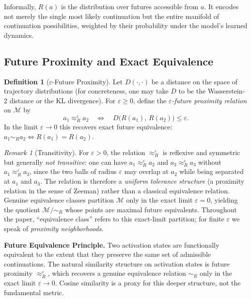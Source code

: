 \documentclass[12pt, a4paper]{article}
\theoremstyle{plain}
\theoremstyle{definition}
\newtheorem{definition}[theorem]{Definition}
\theoremstyle{remark}
\newtheorem{remark}[theorem]{Remark}
\newcommand{\cM}{\mathcal{M}}
\newcommand{\simR}{\sim_R}
\newcommand{\reachset}[1]{R(#1)}
\begin{document}
Informally, $\reachset{a}$ is the distribution over futures accessible from
$a$. It encodes not merely the single most likely continuation but the entire
manifold of continuation possibilities, weighted by their probability under
the model's learned dynamics.

\subsection{Future Proximity and Exact Equivalence}

\begin{definition}[$\varepsilon$-Future Proximity]
  Let $D(\cdot, \cdot)$ be a distance on the space of trajectory distributions
  (for concreteness, one may take $D$ to be the Wasserstein-2 distance or the
  KL divergence). For $\varepsilon \geq 0$, define the
  \emph{$\varepsilon$-future proximity relation} on $\cM$ by
  \begin{equation}
    a_1 \approx_R^\varepsilon a_2
    \quad\iff\quad
    D\bigl(\reachset{a_1},\, \reachset{a_2}\bigr) \leq \varepsilon.
  \end{equation}
  In the limit $\varepsilon \to 0$ this recovers exact future equivalence:
  $a_1 \simR a_2 \iff \reachset{a_1} = \reachset{a_2}$.
\end{definition}

\begin{remark}[Transitivity]
  For $\varepsilon > 0$, the relation $\approx_R^\varepsilon$ is reflexive and
  symmetric but generally \emph{not transitive}: one can have
  $a_1 \approx_R^\varepsilon a_2$ and $a_2 \approx_R^\varepsilon a_3$ without
  $a_1 \approx_R^\varepsilon a_3$, since the two balls of radius $\varepsilon$
  may overlap at $a_2$ while being separated at $a_1$ and $a_3$. The relation
  is therefore a \emph{uniform tolerance structure} (a proximity relation in the
  sense of Zeeman) rather than a classical equivalence relation. Genuine
  equivalence classes partition $\cM$ only in the exact limit $\varepsilon = 0$,
  yielding the quotient $\cM / {\simR}$ whose points are maximal future
  equivalents. Throughout the paper, ``equivalence class'' refers to this
  exact-limit partition; for finite $\varepsilon$ we speak of \emph{proximity
  neighborhoods}.
\end{remark}

\begin{principleBox}
\textbf{Future Equivalence Principle.}
Two activation states are functionally equivalent to the extent that they
preserve the same set of admissible continuations. The natural similarity
structure on activation states is future proximity $\approx_R^\varepsilon$,
which recovers a genuine equivalence relation $\simR$ only in the exact limit
$\varepsilon \to 0$. Cosine similarity is a proxy for this deeper structure,
not the fundamental metric.
\end{principleBox}
\end{document}
